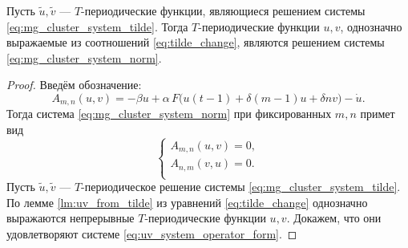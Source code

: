 \begin{lemma}
	\label{lm:uv_inverse_system}
	Пусть $\tilde{u}, \tilde{v}$ --- $T$-периодические функции, являющиеся решением системы \eqref{eq:mg_cluster_system_tilde}. Тогда $T$-периодические функции $u, v$, однозначно выражаемые из соотношений \eqref{eq:tilde_change}, являются решением системы \eqref{eq:mg_cluster_system_norm}.
\end{lemma}
\begin{proof}
	Введём обозначение:
	\begin{equation}
		\label{eq:operator_A_definition}
		A_{m, n}(u, v) = -\beta u + \alpha \, F\big(u(t - 1) + \delta (m - 1)u + \delta n v \big) - \dot{u}.
	\end{equation}
	Тогда система \eqref{eq:mg_cluster_system_norm} при фиксированных $m, n$ примет вид
	\begin{equation}
		\label{eq:uv_system_operator_form}
		\begin{cases}
			A_{m, n}(u, v) = 0,\\
			A_{n, m}(v, u) = 0.\\
		\end{cases} 
	\end{equation}
	Пусть $\tilde{u}, \tilde{v}$ --- $T$-периодическое решение системы \eqref{eq:mg_cluster_system_tilde}. По лемме \ref{lm:uv_from_tilde} из уравнений \eqref{eq:tilde_change} однозначно выражаются непрерывные $T$-периодические функции $u, v$. Докажем, что они удовлетворяют системе \eqref{eq:uv_system_operator_form}.
	

\end{proof}
